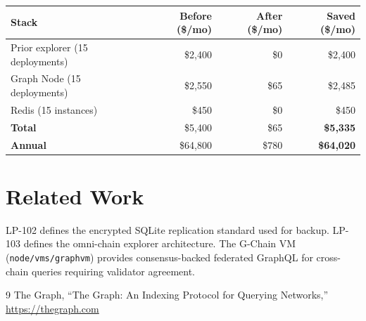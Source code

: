 \documentclass[11pt,a4paper]{article}
\begin{document}
\begin{table}[H]
\centering
\begin{tabular}{lrrr}
\toprule
\textbf{Stack} & \textbf{Before (\$/mo)} & \textbf{After (\$/mo)} & \textbf{Saved (\$/mo)} \\
\midrule
Prior explorer (15 deployments) & \$2{,}400 & \$0 & \$2{,}400 \\
Graph Node (15 deployments) & \$2{,}550 & \$65 & \$2{,}485 \\
Redis (15 instances) & \$450 & \$0 & \$450 \\
\midrule
\textbf{Total} & \$5{,}400 & \$65 & \textbf{\$5{,}335} \\
\textbf{Annual} & \$64{,}800 & \$780 & \textbf{\$64{,}020} \\
\bottomrule
\end{tabular}
\end{table}

\section{Related Work}

LP-102 defines the encrypted SQLite replication standard used for backup.
LP-103 defines the omni-chain explorer architecture.
The G-Chain VM (\texttt{node/vms/graphvm}) provides consensus-backed federated GraphQL
for cross-chain queries requiring validator agreement.

\begin{thebibliography}{9}
 The Graph, ``The Graph: An Indexing Protocol for Querying Networks,'' \url{https://thegraph.com}
\end{thebibliography}
\end{document}
